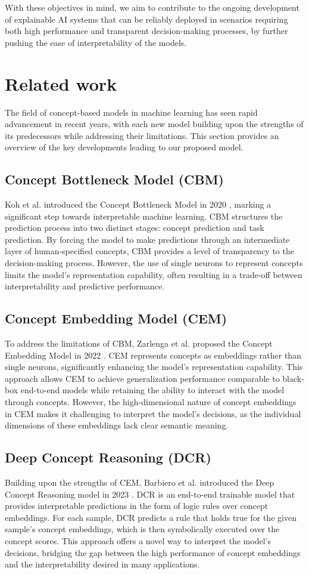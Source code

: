 \documentclass[sigconf, nonacm]{acmart}
\begin{document}
With these objectives in mind, we aim to contribute to the ongoing development of explainable AI systems that can be reliably deployed in scenarios requiring both high performance and transparent decision-making processes, by further pushing the ease of interpretability of the models.

\section{Related work}
The field of concept-based models in machine learning has seen rapid advancement in recent years, with each new model building upon the strengths of its predecessors while addressing their limitations. This section provides an overview of the key developments leading to our proposed model.
\subsection{Concept Bottleneck Model (CBM)}
Koh et al. introduced the Concept Bottleneck Model in 2020 \cite{koh2020concept}, marking a significant step towards interpretable machine learning. CBM structures the prediction process into two distinct stages: concept prediction and task prediction. By forcing the model to make predictions through an intermediate layer of human-specified concepts, CBM provides a level of transparency to the decision-making process. However, the use of single neurons to represent concepts limits the model's representation capability, often resulting in a trade-off between interpretability and predictive performance.
\subsection{Concept Embedding Model (CEM)}
To address the limitations of CBM, Zarlenga et al. proposed the Concept Embedding Model in 2022 \cite{espinosa2022concept}. CEM represents concepts as embeddings rather than single neurons, significantly enhancing the model's representation capability. This approach allows CEM to achieve generalization performance comparable to black-box end-to-end models while retaining the ability to interact with the model through concepts. However, the high-dimensional nature of concept embeddings in CEM makes it challenging to interpret the model's decisions, as the individual dimensions of these embeddings lack clear semantic meaning.
\subsection{Deep Concept Reasoning (DCR)}
Building upon the strengths of CEM, Barbiero et al. introduced the Deep Concept Reasoning model in 2023 \cite{barbiero2023interpretable}. DCR is an end-to-end trainable model that provides interpretable predictions in the form of logic rules over concept embeddings. For each sample, DCR predicts a rule that holds true for the given sample's concept embeddings, which is then symbolically executed over the concept scores. This approach offers a novel way to interpret the model's decisions, bridging the gap between the high performance of concept embeddings and the interpretability desired in many applications.
\end{document}
